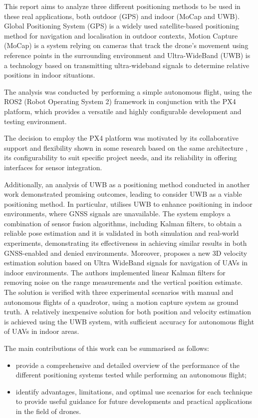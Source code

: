 \documentclass[journal]{IEEEtran}
\begin{document}
This report aims to analyze three different positioning methods to be used in these real applications, both outdoor (GPS) and indoor (MoCap and UWB). Global Positioning System (GPS) is a widely used satellite-based positioning method for navigation and localisation in outdoor contexts, Motion Capture (MoCap) is a system relying on cameras that track the drone's movement using reference points in the surrounding environment and Ultra-WideBand (UWB) is a technology based on transmitting ultra-wideband signals to determine relative positions in indoor situations. 

The analysis was conducted by performing a simple autonomous flight, using the ROS2 (Robot Operating System 2) framework in conjunction with the PX4 platform, which provides a versatile and highly configurable development and testing environment. 

The decision to employ the PX4 platform was motivated by its collaborative support and flexibility shown in some research based on the same architecture\cite{montemurro} \cite{malacarne}, its configurability to suit specific project needs, and its reliability in offering interfaces for sensor integration.

Additionally, an analysis of UWB as a positioning method conducted in another work \cite{conte} demonstrated promising outcomes, leading to consider UWB as a viable positioning method. 
In particular, \cite{conte} utilises UWB to enhance positioning in indoor environments, where GNSS signals are unavailable. The system employs a combination of sensor fusion algorithms, including Kalman filters, to obtain a reliable pose estimation and it is validated in both simulation and real-world experiments, demonstrating its effectiveness in achieving similar results in both GNSS-enabled and denied environments. Moreover, \cite{vicon} proposes a new 3D velocity estimation solution based on Ultra WideBand signals for navigation of UAVs in indoor environments. The authors implemented linear Kalman filters for removing noise on the range measurements and the vertical position estimate. The solution is verified with three experimental scenarios with manual and autonomous flights of a quadrotor, using a motion capture system as ground truth. A relatively inexpensive solution for both position and velocity estimation is achieved using the UWB system, with sufficient accuracy for autonomous flight of UAVs in indoor areas. 

The main contributions of this work can be summarised as follows: 
\begin{itemize}
    \item provide a comprehensive and detailed overview of the performance of the different positioning systems tested while performing an autonomous flight;
    \item identify advantages, limitations, and optimal use scenarios for each technique to provide useful guidance for future developments and practical applications in the field of drones.
\end{itemize}
\end{document}
